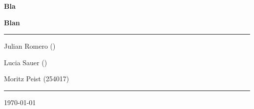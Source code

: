 \documentclass[11pt]{article}
\begin{document}
\begin{titlepage}
	\centering
	\par\vspace{0.75cm}
	{\huge\bfseries Bla\par}
    {\large\bfseries Blan\par}
	\vspace{0.25cm}
    \noindent\rule{\textwidth}{1pt}
    {\Large Julian Romero ()\par}
    {\Large Lucia Sauer ()\par}
	{\Large Moritz Peist (254017)\par}
    \noindent\rule{\textwidth}{1pt}
    \vfill
    \begin{abstract}
        \noindent
        bla bla.
    \end{abstract}
	\vfill
	{\large \today\par}
\end{titlepage}

\tableofcontents
\thispagestyle{empty}

\newpage
\addtocounter{page}{-1}






\newpage
\printbibliography[heading=bibintoc,title={References}]

\newpage

\end{document}
